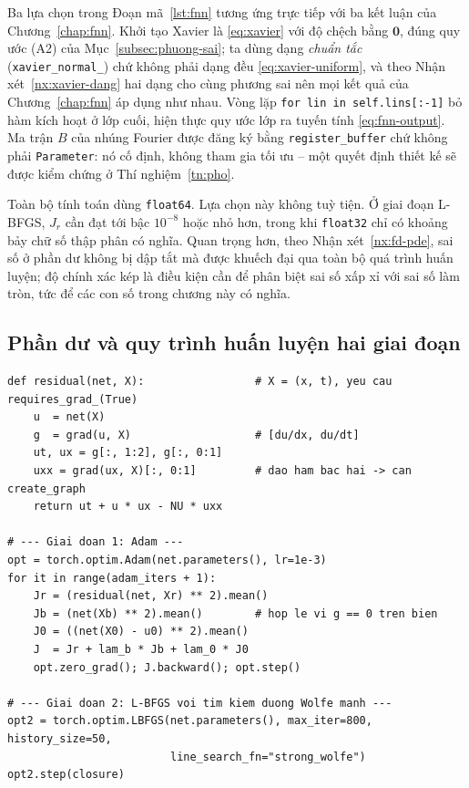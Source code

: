Ba lựa chọn trong Đoạn mã~\ref{lst:fnn} tương ứng trực tiếp với ba kết luận của
Chương~\ref{chap:fnn}. Khởi tạo Xavier là \eqref{eq:xavier} với độ chệch bằng
$\bm{0}$, đúng quy ước (A2) của Mục~\ref{subsec:phuong-sai}; ta dùng dạng
\emph{chuẩn tắc} (\texttt{xavier\_normal\_}) chứ không phải dạng đều
\eqref{eq:xavier-uniform}, và theo Nhận xét~\ref{nx:xavier-dang} hai dạng cho
cùng phương sai nên mọi kết quả của Chương~\ref{chap:fnn} áp dụng như nhau. Vòng lặp
\texttt{for lin in self.lins[:-1]} bỏ hàm kích hoạt ở lớp cuối, hiện thực quy ước
lớp ra tuyến tính \eqref{eq:fnn-output}. Ma trận $B$ của nhúng Fourier được đăng
ký bằng \texttt{register\_buffer} chứ không phải \texttt{Parameter}: nó cố định,
không tham gia tối ưu -- một quyết định thiết kế sẽ được kiểm chứng ở
Thí nghiệm~\ref{tn:pho}.
 
Toàn bộ tính toán dùng \texttt{float64}. Lựa chọn này không tuỳ tiện. Ở giai đoạn
L-BFGS, $J_r$ cần đạt tới bậc $10^{-8}$ hoặc nhỏ hơn, trong khi \texttt{float32}
chỉ có khoảng bảy chữ số thập phân có nghĩa. Quan trọng hơn, theo
Nhận xét~\ref{nx:fd-pde}, sai số ở phần dư không bị dập tắt mà được khuếch đại
qua toàn bộ quá trình huấn luyện; độ chính xác kép là điều kiện cần để phân biệt
sai số xấp xỉ với sai số làm tròn, tức để các con số trong chương này có nghĩa.
 
\subsection{Phần dư và quy trình huấn luyện hai giai đoạn}
 
\begin{lstlisting}[caption={Phần dư của phương trình Burgers và vòng huấn luyện.},label={lst:train}]
def residual(net, X):                 # X = (x, t), yeu cau requires_grad_(True)
    u  = net(X)
    g  = grad(u, X)                   # [du/dx, du/dt]
    ut, ux = g[:, 1:2], g[:, 0:1]
    uxx = grad(ux, X)[:, 0:1]         # dao ham bac hai -> can create_graph
    return ut + u * ux - NU * uxx
 
# --- Giai doan 1: Adam ---
opt = torch.optim.Adam(net.parameters(), lr=1e-3)
for it in range(adam_iters + 1):
    Jr = (residual(net, Xr) ** 2).mean()
    Jb = (net(Xb) ** 2).mean()        # hop le vi g == 0 tren bien
    J0 = ((net(X0) - u0) ** 2).mean()
    J  = Jr + lam_b * Jb + lam_0 * J0
    opt.zero_grad(); J.backward(); opt.step()
 
# --- Giai doan 2: L-BFGS voi tim kiem duong Wolfe manh ---
opt2 = torch.optim.LBFGS(net.parameters(), max_iter=800, history_size=50,
                         line_search_fn="strong_wolfe")
opt2.step(closure)
\end{lstlisting}
 
